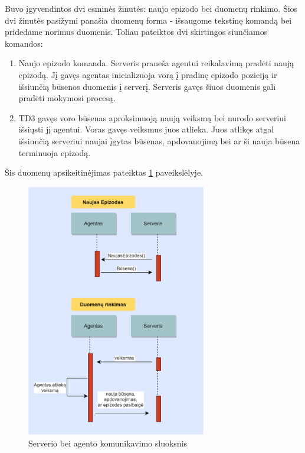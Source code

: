 \documentclass[a4paper, 12pt]{article}
\begin{document}
Buvo įgyvendintos dvi esminės žinutės: naujo epizodo bei duomenų rinkimo. Šios dvi žinutės pasižymi panašia duomenų forma - išsaugome tekstinę komandą bei pridedame norimus duomenis. Toliau pateiktos dvi skirtingos siunčiamos komandos:

\begin{enumerate}
  \addtolength{\itemsep}{-0.5\baselineskip} 
  \item Naujo epizodo komanda. Serveris praneša agentui reikalavimą pradėti naują epizodą. Jį gavęs agentas inicializuoja vorą į pradinę epizodo poziciją ir išsiunčią būsenos duomenis į serverį. Serveris gavęs šiuos duomenis gali pradėti mokymosi procesą.
  \item TD3 gavęs voro būsenas aproksimuoją naują veiksmą bei nurodo serveriui išsiųsti jį agentui. Voras gavęs veiksmus juos atlieka. Juos atlikęs atgal išsiunčią serveriui naujai įgytas būsenas, apdovanojimą bei ar ši nauja būsena terminuoja epizodą.
\end{enumerate}

Šis duomenų apsikeitinėjimas pateiktas \ref{Reset} paveikslėlyje.

\begin{figure}[h]
\centering
\includegraphics[width=0.7\textwidth]{Reset}
\caption{Serverio bei agento komunikavimo sluoksnis}
\label{Reset}
\end{figure}
\end{document}
